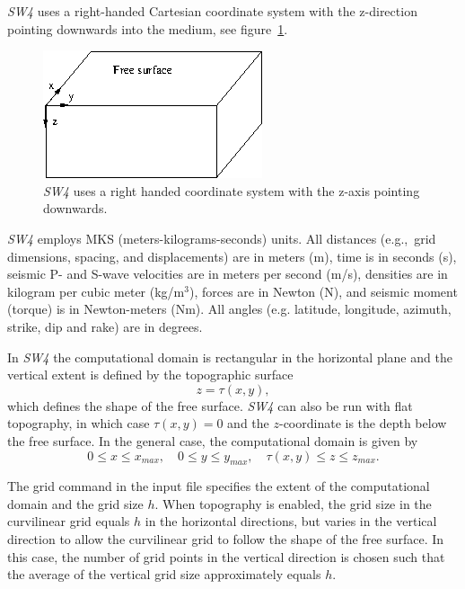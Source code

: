 \documentclass[11pt]{report}
\begin{document}
\emph{SW4} uses a right-handed Cartesian coordinate system with the z-direction pointing
downwards into the medium, see figure~\ref{fig:coordsys}. 
\begin{figure}[th]
\begin{centering}
 \includegraphics[width=0.6\linewidth]{coords.png}
  \caption{\emph{SW4} uses a right handed coordinate system with the z-axis pointing
  downwards.}
  \label{fig:coordsys}
\end{centering}
\end{figure}
\emph{SW4} employs MKS (meters-kilograms-seconds) units. All distances (e.g.,~grid dimensions,
spacing, and displacements) are in meters (m), time is in seconds (s), seismic P- and S-wave
velocities are in meters per second (m/s), densities are in kilogram per cubic meter (kg/m$^3$),
forces are in Newton (N), and seismic moment (torque) is in Newton-meters (Nm). All angles
(e.g. latitude, longitude, azimuth, strike, dip and rake) are in degrees. 

In \emph{SW4} the computational domain is rectangular in the horizontal plane and the vertical extent
is defined by the topographic surface
\[
z=\tau(x,y),
\]
which defines the shape of the free surface. \emph{SW4} can also be run with flat topography, in
which case $\tau(x,y)=0$ and the $z$-coordinate is the depth below the free surface. In the general
case, the computational domain is given by
\begin{equation}\label{eq:domain}
0\leq x\leq x_{max},\quad 0\leq y\leq y_{max},\quad \tau(x,y) \leq z \leq z_{max}.
\end{equation}

The grid command in the input file specifies the extent of the computational domain and the grid
size $h$. When topography is enabled, the grid size in the curvilinear grid equals $h$ in the
horizontal directions, but varies in the vertical direction to allow the curvilinear grid to follow
the shape of the free surface. In this case, the number of grid points in the vertical direction is
chosen such that the average of the vertical grid size approximately equals $h$.
\end{document}
